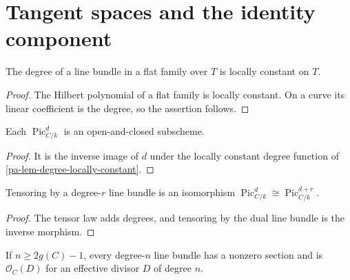 \chapter{Tangent spaces and the identity component}
\label{pa-ch-pic0}

\begin{lemma}
  \label{pa-lem-degree-locally-constant}
  \cite{kleiman-picard}
  The degree of a line bundle in a flat family over \(T\) is locally constant
  on \(T\).
\end{lemma}

\begin{proof}
  The Hilbert polynomial of a flat family is locally constant.  On a curve its
  linear coefficient is the degree, so the assertion follows.
\end{proof}

\begin{lemma}
  \label{pa-lem-degree-open-closed}
  \cite{kleiman-picard}
  Each \(\operatorname{Pic}^d_{C/k}\) is an open-and-closed subscheme.
\end{lemma}

\begin{proof}
  It is the inverse image of \(d\) under the locally constant degree function
  of \ref{pa-lem-degree-locally-constant}.
\end{proof}

\begin{lemma}
  \label{pa-lem-pic0-translation}
  \cite{kleiman-picard}
  Tensoring by a degree-\(r\) line bundle is an isomorphism
  \(\operatorname{Pic}^d_{C/k}\cong\operatorname{Pic}^{d+r}_{C/k}\).
\end{lemma}

\begin{proof}
  The tensor law adds degrees, and tensoring by the dual line bundle is the
  inverse morphism.
\end{proof}

\begin{lemma}
  \label{pa-lem-large-degree-effective}
  \cite{hartshorne-ag,papaioannou-rr}
  If \(n\ge2g(C)-1\), every degree-\(n\) line bundle has a nonzero section and
  is \(\mathcal O_C(D)\) for an effective divisor \(D\) of degree \(n\).
\end{lemma}

